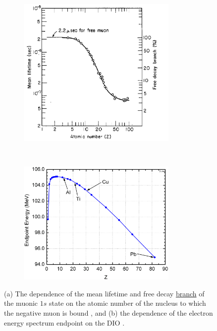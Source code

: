 \begin{figure}[!h]
    \centering
    \begin{subfigure}[t]{0.5\textwidth}
        \centering
        \includegraphics[width=0.85\textwidth]{figures/png/lifetime_mu_matter.png}
        \caption{}
        \label{fig:muonicatom}
    \end{subfigure}%
    ~ 
    \begin{subfigure}[t]{0.5\textwidth}
        \centering
        \includegraphics[width=0.85\textwidth]{figures/png/endopint.png}
        \caption{}
        \label{fig:endpoint}
    \end{subfigure}
   \caption[The muonic atom mean lifetime and free decay branch. The dependence 
   of the electron energy spectrum endpoint
   on the DIO.]{(a) The dependence of the mean lifetime and free decay \underline{\red branch}
   of the muonic $1s$ state on the atomic number of the nucleus to which 
   the negative muon is bound \cite{TYamazaki_1975}, and (b) 
   the dependence of the electron 
   energy spectrum endpoint on the DIO \cite{dukes}.}
    \label{fig:2imins}
  \end{figure}
